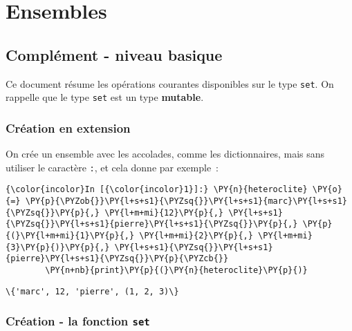     
    
    
    

    

    \hypertarget{ensembles}{%
\section{Ensembles}\label{ensembles}}

    \hypertarget{compluxe9ment---niveau-basique}{%
\subsection{Complément - niveau
basique}\label{compluxe9ment---niveau-basique}}

    Ce document résume les opérations courantes disponibles sur le type
\texttt{set}. On rappelle que le type \texttt{set} est un type
\textbf{mutable}.

    \hypertarget{cruxe9ation-en-extension}{%
\subsubsection{Création en extension}\label{cruxe9ation-en-extension}}

    On crée un ensemble avec les accolades, comme les dictionnaires, mais
sans utiliser le caractère \texttt{:}, et cela donne par exemple~:

    \begin{Verbatim}[commandchars=\\\{\}]
{\color{incolor}In [{\color{incolor}1}]:} \PY{n}{heteroclite} \PY{o}{=} \PY{p}{\PYZob{}}\PY{l+s+s1}{\PYZsq{}}\PY{l+s+s1}{marc}\PY{l+s+s1}{\PYZsq{}}\PY{p}{,} \PY{l+m+mi}{12}\PY{p}{,} \PY{l+s+s1}{\PYZsq{}}\PY{l+s+s1}{pierre}\PY{l+s+s1}{\PYZsq{}}\PY{p}{,} \PY{p}{(}\PY{l+m+mi}{1}\PY{p}{,} \PY{l+m+mi}{2}\PY{p}{,} \PY{l+m+mi}{3}\PY{p}{)}\PY{p}{,} \PY{l+s+s1}{\PYZsq{}}\PY{l+s+s1}{pierre}\PY{l+s+s1}{\PYZsq{}}\PY{p}{\PYZcb{}}
        \PY{n+nb}{print}\PY{p}{(}\PY{n}{heteroclite}\PY{p}{)}
\end{Verbatim}


    \begin{Verbatim}[commandchars=\\\{\}]
\{'marc', 12, 'pierre', (1, 2, 3)\}

    \end{Verbatim}

    \hypertarget{cruxe9ation---la-fonction-set}{%
\subsubsection{\texorpdfstring{Création - la fonction
\texttt{set}}{Création - la fonction set}}\label{cruxe9ation---la-fonction-set}}

